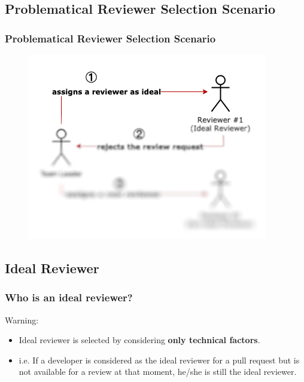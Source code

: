 \documentclass{beamer}
\begin{document}
\subsection{Problematical Reviewer Selection Scenario}
\begin{frame}
\frametitle{\large Problematical Reviewer Selection Scenario}
  \begin{figure}
    \includegraphics[scale=0.6]{img/gt_1.png}
    \end{figure}

\end{frame}
\subsection{Ideal Reviewer}
\begin{frame}
\frametitle{\large Who is an ideal reviewer?}
    \pause
    \begin{alertblock}{Warning:}
        \begin{itemize}
        \item Ideal reviewer is selected by considering \textbf{only technical factors}.
        \item i.e. If a developer is considered as the ideal reviewer for a pull request but is not available for a review at that moment, he/she is still the ideal reviewer.
        \end{itemize}
    \end{alertblock}
\end{frame}
\end{document}
